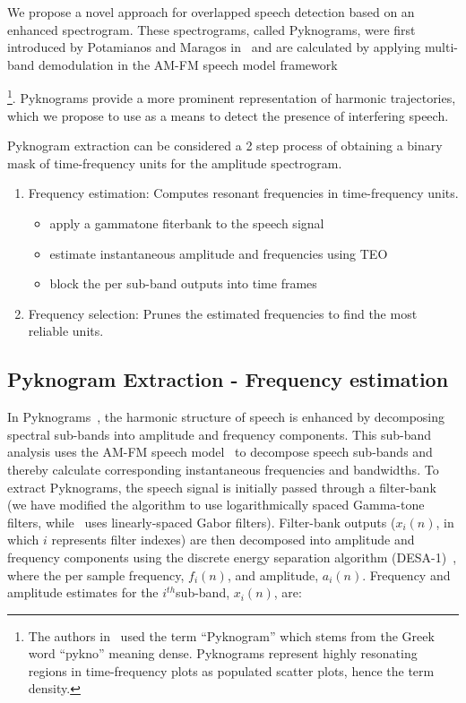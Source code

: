 We propose a novel approach for overlapped speech detection based on an enhanced spectrogram. 
These spectrograms, called Pyknograms, were first introduced by Potamianos and Maragos in~\cite{potamianos_maragos_icassp95,potamianos_maragos_jasa96} and are calculated by applying multi-band demodulation in the AM-FM speech model framework~\cite{maragos_kaiser_quatieri}{\footnote{The authors in~\cite{potamianos_maragos_jasa96} used the term ``Pyknogram'' which stems from the Greek word ``pykno'' meaning dense. Pyknograms represent highly resonating regions in time-frequency plots as populated scatter plots, hence the term density.}. 
Pyknograms provide a more prominent representation of harmonic trajectories, which we propose to use as a means to detect the presence of interfering speech.

Pyknogram extraction can be considered a 2 step process of obtaining a binary mask of time-frequency units for the amplitude spectrogram. 
\begin{enumerate}
	\item Frequency estimation: Computes resonant frequencies in time-frequency units.  
	\begin{itemize}
		\item apply a gammatone fiterbank to the speech signal
		\item estimate instantaneous amplitude and frequencies using TEO
		\item block the per sub-band outputs into time frames
	\end{itemize}
	\item Frequency selection: Prunes the estimated frequencies to find the most reliable units.
\end{enumerate}

\subsection{Pyknogram Extraction - Frequency estimation}
\label{ssec:pykno_estimate}
In Pyknograms~\cite{potamianos_maragos_jasa96}, the harmonic structure of speech is enhanced by decomposing spectral sub-bands into amplitude and frequency components. 
This sub-band analysis uses the AM-FM speech model~\cite{maragos_kaiser_quatieri} to decompose speech sub-bands and thereby calculate corresponding instantaneous frequencies and bandwidths. 
To extract Pyknograms, the speech signal is initially passed through a filter-bank (we have modified the algorithm to use logarithmically spaced Gamma-tone filters, while~\cite{potamianos_maragos_jasa96} uses linearly-spaced Gabor filters). 
Filter-bank outputs ($x_i(n)$, in which $i$ represents filter indexes) are then decomposed into amplitude and frequency components using the discrete energy separation algorithm (DESA-1)~\cite{maragos_kaiser_quatieri}, where the per sample frequency, $f_i(n)$, and amplitude, $a_i(n)$. Frequency and amplitude estimates for the $i^{th} $sub-band, $x_i(n)$, are:

}
